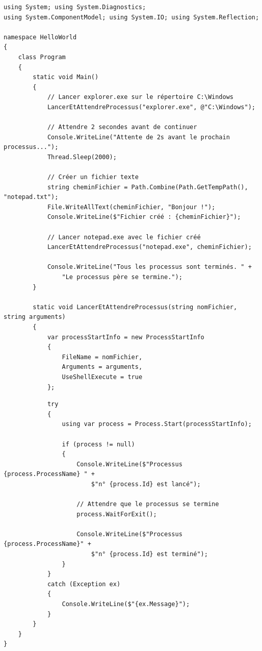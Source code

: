 \begin{verbatim}
using System; using System.Diagnostics;
using System.ComponentModel; using System.IO; using System.Reflection;

namespace HelloWorld
{
    class Program
    {
        static void Main()
        {
            // Lancer explorer.exe sur le répertoire C:\Windows
            LancerEtAttendreProcessus("explorer.exe", @"C:\Windows");

            // Attendre 2 secondes avant de continuer
            Console.WriteLine("Attente de 2s avant le prochain processus...");
            Thread.Sleep(2000);

            // Créer un fichier texte
            string cheminFichier = Path.Combine(Path.GetTempPath(), "notepad.txt");
            File.WriteAllText(cheminFichier, "Bonjour !");
            Console.WriteLine($"Fichier créé : {cheminFichier}");

            // Lancer notepad.exe avec le fichier créé
            LancerEtAttendreProcessus("notepad.exe", cheminFichier);

            Console.WriteLine("Tous les processus sont terminés. " +
                "Le processus père se termine.");
        }

        static void LancerEtAttendreProcessus(string nomFichier, string arguments)
        {
            var processStartInfo = new ProcessStartInfo
            {
                FileName = nomFichier,
                Arguments = arguments,
                UseShellExecute = true
            };

\end{verbatim}

\newpage

\begin{verbatim}
            try
            {
                using var process = Process.Start(processStartInfo);

                if (process != null)
                {
                    Console.WriteLine($"Processus {process.ProcessName} " +
                        $"n° {process.Id} est lancé");

                    // Attendre que le processus se termine
                    process.WaitForExit();

                    Console.WriteLine($"Processus {process.ProcessName}" +
                        $"n° {process.Id} est terminé");
                }
            }
            catch (Exception ex)
            {
                Console.WriteLine($"{ex.Message}");
            }
        }
    }
}

\end{verbatim}

